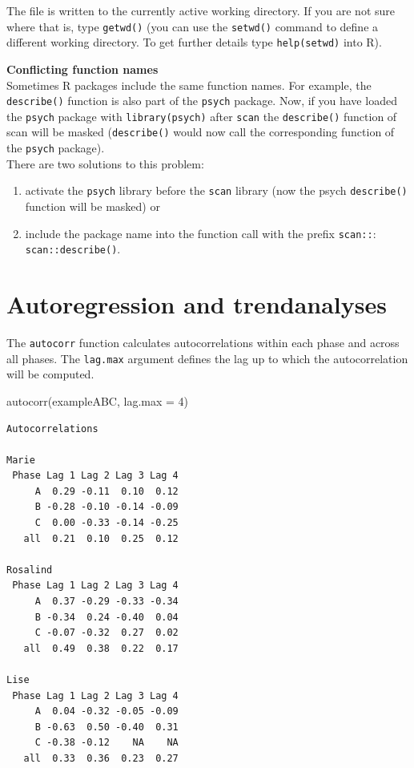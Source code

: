 \documentclass[
]{book}
\makeatletter
\newenvironment{Shaded}{\begin{snugshade}}{\end{snugshade}}
\newcommand{\AttributeTok}[1]{\textcolor[rgb]{0.77,0.63,0.00}{#1}}
\newcommand{\DecValTok}[1]{\textcolor[rgb]{0.00,0.00,0.81}{#1}}
\newcommand{\FunctionTok}[1]{\textcolor[rgb]{0.00,0.00,0.00}{#1}}
\newcommand{\NormalTok}[1]{#1}
\providecommand{\tightlist}{%
  \setlength{\itemsep}{0pt}\setlength{\parskip}{0pt}}
\newenvironment{kframe}{%
\medskip{}
\setlength{\fboxsep}{.8em}
 \def\at@end@of@kframe{}%
 \ifinner\ifhmode%
  \def\at@end@of@kframe{\end{minipage}}%
  \begin{minipage}{\columnwidth}%
 \fi\fi%
 \def\FrameCommand##1{\hskip\@totalleftmargin \hskip-\fboxsep
 \colorbox{shadecolor}{##1}\hskip-\fboxsep
     \hskip-\linewidth \hskip-\@totalleftmargin \hskip\columnwidth}%
 \MakeFramed {\advance\hsize-\width
   \@totalleftmargin\z@ \linewidth\hsize
   \@setminipage}}%
 {\par\unskip\endMakeFramed%
 \at@end@of@kframe}
\newenvironment{rmdblock}[1]
  {
  \begin{itemize}
  \renewcommand{\labelitemi}{
    \raisebox{-.7\height}[0pt][0pt]{
      {\setkeys{Gin}{width=3em,keepaspectratio}\texttt{[image: images/\#1]}}
    }
  }
  \setlength{\fboxsep}{1em}
  \begin{kframe}
  \item
  }
  {
  \end{kframe}
  \end{itemize}
  }
\newenvironment{rmdnote}
  {\begin{rmdblock}{bulp}}
{\end{rmdblock}}
\makeatother
\begin{document}
The file is written to the currently active working directory. If you are not sure where that is, type \texttt{getwd()} (you can use the \texttt{setwd()} command to define a different working directory. To get further details type \texttt{help(setwd)} into R).

\begin{rmdnote}
\textbf{Conflicting function names}\\
Sometimes R packages include the same function names. For example, the
\texttt{describe()} function is also part of the \texttt{psych} package.
Now, if you have loaded the \texttt{psych} package with
\texttt{library(psych)} after \texttt{scan} the \texttt{describe()}
function of scan will be masked (\texttt{describe()} would now call the
corresponding function of the \texttt{psych} package).\\
There are two solutions to this problem:

\begin{enumerate}
\def\labelenumi{\arabic{enumi}.}
\tightlist
\item
  activate the \texttt{psych} library before the \texttt{scan} library
  (now the psych \texttt{describe()} function will be masked) or
\item
  include the package name into the function call with the prefix
  \texttt{scan::}: \texttt{scan::describe()}.
\end{enumerate}
\end{rmdnote}

\hypertarget{autoregression-and-trendanalyses}{%
\section{Autoregression and trendanalyses}\label{autoregression-and-trendanalyses}}

The \texttt{autocorr} function calculates autocorrelations within each phase and across all phases. The \texttt{lag.max} argument defines the lag up to which the autocorrelation will be computed.

\begin{Shaded}
\begin{Highlighting}[]
\FunctionTok{autocorr}\NormalTok{(exampleABC, }\AttributeTok{lag.max =} \DecValTok{4}\NormalTok{)}
\end{Highlighting}
\end{Shaded}

\begin{verbatim}
Autocorrelations

Marie 
 Phase Lag 1 Lag 2 Lag 3 Lag 4
     A  0.29 -0.11  0.10  0.12
     B -0.28 -0.10 -0.14 -0.09
     C  0.00 -0.33 -0.14 -0.25
   all  0.21  0.10  0.25  0.12

Rosalind 
 Phase Lag 1 Lag 2 Lag 3 Lag 4
     A  0.37 -0.29 -0.33 -0.34
     B -0.34  0.24 -0.40  0.04
     C -0.07 -0.32  0.27  0.02
   all  0.49  0.38  0.22  0.17

Lise 
 Phase Lag 1 Lag 2 Lag 3 Lag 4
     A  0.04 -0.32 -0.05 -0.09
     B -0.63  0.50 -0.40  0.31
     C -0.38 -0.12    NA    NA
   all  0.33  0.36  0.23  0.27
\end{verbatim}
\end{document}
